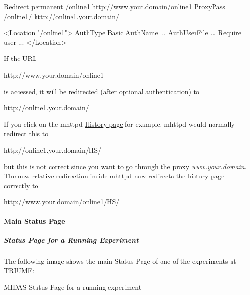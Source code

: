 \begin{DoxyCode}
Redirect permanent /online1 http://www.your.domain/online1
ProxyPass /online1/  http://online1.your.domain/

<Location "/online1">
  AuthType Basic
  AuthName ...
  AuthUserFile ...
  Require user ...
</Location>
\end{DoxyCode}


If the URL 
\begin{DoxyCode}
http://www.your.domain/online1
\end{DoxyCode}
 is accessed, it will be redirected (after optional authentication) to 
\begin{DoxyCode}
http://online1.your.domain/
\end{DoxyCode}
 \par
 If you click on the mhttpd \hyperlink{RC_mhttpd_History_page}{History page} for example, mhttpd would normally redirect this to 
\begin{DoxyCode}
http://online1.your.domain/HS/
\end{DoxyCode}
 but this is not correct since you want to go through the proxy {\itshape www.your.domain\/}. The new relative redirection inside mhttpd now redirects the history page correctly to 
\begin{DoxyCode}
http://www.your.domain/online1/HS/
\end{DoxyCode}


\label{index_end}
\hypertarget{index_end}{}
 \par
  \paragraph{Main Status Page}\label{RC_mhttpd_Main_Status_page}
\label{RC_mhttpd_status_page_redesign_idx_mhttpd_page_status}
\hypertarget{RC_mhttpd_status_page_redesign_idx_mhttpd_page_status}{}


\par


 \par


\label{RC_mhttpd_Main_Status_page_RC_mhttpd_main_status}
\hypertarget{RC_mhttpd_Main_Status_page_RC_mhttpd_main_status}{}
 \hypertarget{RC_mhttpd_Main_Status_page_RC_mhttpd_msp_customized}{}\subparagraph{Status Page for a Running Experiment}\label{RC_mhttpd_Main_Status_page_RC_mhttpd_msp_customized}
The following image shows the main Status Page of one of the experiments at TRIUMF:

\begin{center} MIDAS Status Page for a running experiment \par
\par
\par
  \end{center}  \par


